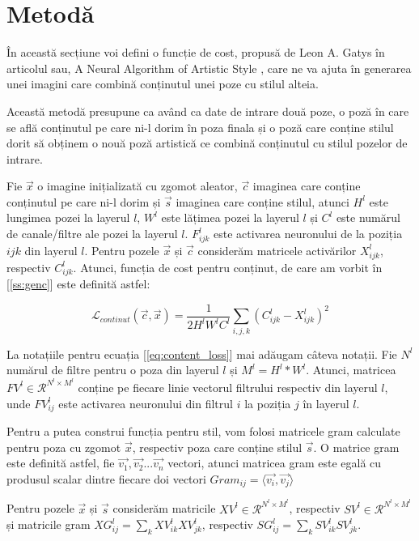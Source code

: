 \section{Metodă}
În această secțiune voi defini o funcție de cost, propusă de Leon A. Gatys în articolul sau, A Neural Algorithm of Artistic Style \cite{gatys2015}, care ne va ajuta în generarea unei imagini care combină conținutul unei poze cu stilul alteia.

Această metodă presupune ca având ca date de intrare două poze, o poză în care se află conținutul pe care ni-l dorim în poza finala și o poză care conține stilul dorit să obținem o nouă poză artistică ce combină conținutul cu stilul pozelor de intrare.

Fie $\vec{x}$ o imagine inițializată cu zgomot aleator, $\vec{c}$ imaginea care conține conținutul pe care ni-l dorim și $\vec{s}$ imaginea care conține stilul, atunci $H^l$ este lungimea pozei la layerul $l$, $W^l$ este lățimea pozei la layerul $l$ și $C^l$ este numărul de canale/filtre ale pozei la layerul $l$. $F_{ijk}^l$ este activarea neuronului de la poziția $ijk$ din layerul $l$. Pentru pozele $\vec{x}$ și $\vec{c}$ considerăm matricele activărilor $X_{ijk}^l$, respectiv $C_{ijk}^l$. Atunci, funcția de cost pentru conținut, de care am vorbit în [\ref{ss:genc}] este definită astfel:

\begin{equation}
\label{eq:content_loss}
\mathcal{L}_{continut}(\vec{c}, \vec{x}) = \frac{1}{2H^{l}W^{l}C^{l}} \sum_{i, j, k}{(C_{ijk}^l - X_{ijk}^l)^2}
\end{equation}

La notațiile pentru ecuația [\ref{eq:content_loss}] mai adăugam câteva notații. Fie $N^l$ numărul de filtre pentru o poza din layerul $l$ și $M^l = H^{l} * W^{l}$. Atunci, matricea $FV^l \in \mathcal{R}^{N^{l} \times M^{l}}$ conține pe fiecare linie vectorul filtrului respectiv din layerul $l$, unde $FV_{ij}^l$ este activarea neuronului din filtrul $i$ la poziția $j$ în layerul $l$.

Pentru a putea construi funcția pentru stil, vom folosi matricele gram calculate pentru poza cu zgomot $\vec{x}$, respectiv poza care conține stilul $\vec{s}$. O matrice gram este definită astfel, fie $\vec{v_1}, \vec{v_2} ... \vec{v_n}$ vectori, atunci matricea gram este egală cu produsul scalar dintre fiecare doi vectori $Gram_{ij} = \langle {\vec{v_i}, \vec{v_j}} \rangle$ \cite{wiki_gram}

Pentru pozele $\vec{x}$ și $\vec{s}$ considerăm matricile $XV^l \in \mathcal{R}^{N^{l} \times M^{l}}$, respectiv $SV^l \in \mathcal{R}^{N^{l} \times M^{l}}$ și matricile gram $XG_{ij}^l = \displaystyle \sum_{k}{XV_{ik}^l XV_{jk}^l}$, respectiv $SG_{ij}^l = \displaystyle \sum_{k}{SV_{ik}^l SV_{jk}^l}$.

